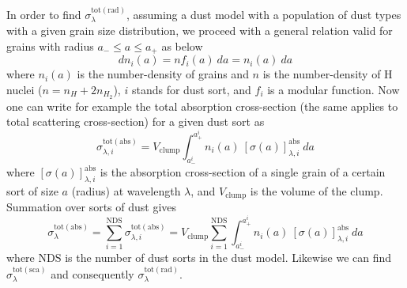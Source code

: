 \documentclass[twocolumn]{aastex62}
\begin{document}
In order to find $\sigma_{\lambda}^{\mathrm{tot(rad)}}$, assuming a dust model with a population of dust types with a given grain size distribution, we proceed with a general relation valid for grains with radius $a_{-} \leq a \leq a_{+}$ as below
\begin{equation}\label{eq:distribution}
dn_{i}(a) = n f_{i}(a)\ da = n_{i}(a)\ da 
\end{equation}
where $n_{i}(a)$ is the number-density of grains and $n$ is the number-density of H nuclei ($n = n_{H} + 2 n_{H_{2}}$), $i$ stands for dust sort, and $f_{i}$ is a modular function.
Now one can write for example the total absorption cross-section (the same applies to total scattering cross-section) for a given dust sort as
\begin{equation}
\sigma_{\lambda, i}^{\mathrm{tot(abs)}} = V_{\mathrm{clump}}
\int^{a^{i}_{+}}_{a^{i}_{-}}
n_{i}(a)\ [\sigma(a)]_{\lambda, i}^{\mathrm{abs}}\ da
\end{equation}
where $[\sigma(a)]_{\lambda, i}^{\mathrm{abs}}$ is the absorption cross-section of a single grain of a certain sort of size $a$ (radius) at wavelength $\lambda$, and $V_{\mathrm{clump}}$ is the volume of the clump. Summation over sorts of dust gives
\begin{equation}
\sigma_{\lambda}^{\mathrm{tot(abs)}} =
\sum_{i=1}^{\mathrm{NDS}}
\sigma_{\lambda, i}^{\mathrm{tot(abs)}} =
V_{\mathrm{clump}}
\sum_{i=1}^{\mathrm{NDS}} \int^{a^{i}_{+}}_{a^{i}_{-}}
n_{i}(a)\ [\sigma(a)]_{\lambda, i}^{\mathrm{abs}}\ da
\end{equation}
where $\mathrm{NDS}$ is the number of dust sorts in the dust model. Likewise we can find $\sigma_{\lambda}^{\mathrm{tot(sca)}}$ and consequently $\sigma_{\lambda}^{\mathrm{tot(rad)}}$.
\end{document}
